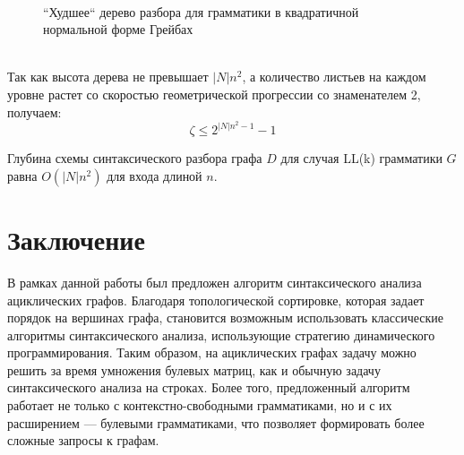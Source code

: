 \documentclass{spbau-diploma}
\begin{document}
\begin{figure}
\centering
{}
 \\
	\caption{``Худшее`` дерево разбора для грамматики в квадратичной нормальной форме Грейбах}
\label{LLw}
\end{figure}
\\
Так как высота дерева не превышает $|N|n^2$, а количество листьев на каждом уровне растет со скоростью геометрической прогрессии со знаменателем 2, получаем:
\begin{equation}
\zeta \le  2^{|N|n^2 - 1} - 1
\end{equation}
\begin{corollaryrus} 
Глубина схемы синтаксического разбора графа $D$ для случая LL(k) грамматики $G$ равна $O(|N|n^2)$ для входа длиной $n$.
\end{corollaryrus}


\section*{Заключение}
В рамках данной работы был предложен алгоритм синтаксического анализа ациклических графов. Благодаря топологической сортировке, которая задает порядок на вершинах графа, становится возможным использовать классические алгоритмы синтаксического анализа, использующие стратегию динамического программирования. Таким образом, на ациклических графах задачу можно решить за время умножения булевых матриц, как и обычную задачу синтаксического анализа на строках. Более того, предложенный алгоритм работает не только с контекстно-свободными грамматиками, но и с их расширением --- булевыми грамматиками, что позволяет формировать более сложные запросы к графам.
\end{document}
